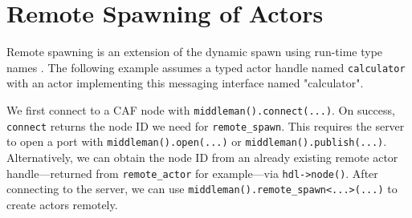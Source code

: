 \section{Remote Spawning of Actors \experimental}
\label{remote-spawn}

Remote spawning is an extension of the dynamic spawn using run-time type names
. The following example assumes a typed actor handle
named \lstinline^calculator^ with an actor implementing this messaging
interface named "calculator".


We first connect to a CAF node with \lstinline^middleman().connect(...)^. On
success, \lstinline^connect^ returns the node ID we need for
\lstinline^remote_spawn^. This requires the server to open a port with
\lstinline^middleman().open(...)^ or \lstinline^middleman().publish(...)^.
Alternatively, we can obtain the node ID from an already existing remote actor
handle---returned from \lstinline^remote_actor^ for example---via
\lstinline^hdl->node()^. After connecting to the server, we can use
\lstinline^middleman().remote_spawn<...>(...)^ to create actors remotely.
